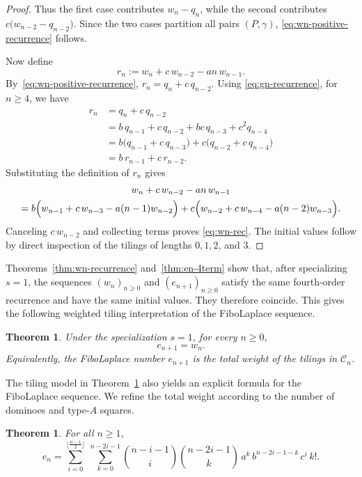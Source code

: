 \documentclass[11pt]{amsart}
\theoremstyle{plain}
\numberwithin{equation}{section}
\newtheorem{theorem}[thm]{Theorem}
\begin{document}
\begin{proof}
Thus the first case contributes $w_n-q_n$, while the second contributes
$c\bigl(w_{n-2}-q_{n-2}\bigr)$. Since the two cases partition all
pairs $(P,\gamma)$, \eqref{eq:wn-positive-recurrence} follows.

Now define
\[
r_n:=w_n+c\,w_{n-2}-an\,w_{n-1}.
\]
By~\eqref{eq:wn-positive-recurrence}, $r_n=q_n+c\,q_{n-2}$. Using \eqref{eq:gn-recurrence}, for $n\geq 4$, we have
\begin{align*}
r_n
&=q_n+c\,q_{n-2}\\
&=b\,q_{n-1}+c\,q_{n-2}
  +bc\,q_{n-3}+c^2q_{n-4}\\
&=b\bigl(q_{n-1}+c\,q_{n-3}\bigr)
  +c\bigl(q_{n-2}+c\,q_{n-4}\bigr)\\
&=b\,r_{n-1}+c\,r_{n-2}.
\end{align*}
Substituting the definition of $r_n$ gives
\begin{multline*}
w_n+c\,w_{n-2}-an\,w_{n-1}
\\=
b\Bigl(
w_{n-1}+c\,w_{n-3}-a(n-1)w_{n-2}
\Bigr)+
c\Bigl(
w_{n-2}+c\,w_{n-4}-a(n-2)w_{n-3}
\Bigr).
\end{multline*}
Canceling $c\,w_{n-2}$ and collecting terms proves \eqref{eq:wn-rec}. The initial values follow by direct inspection of the tilings of lengths $0,1,2$, and $3$.
\end{proof}
\par\medskip

Theorems~\ref{thm:wn-recurrence} and~\ref{thm:en-4term} show that,
after specializing $s=1$, the sequences $(w_n)_{n\geq 0}$ and
$(e_{n+1})_{n\geq 0}$ satisfy the same fourth-order recurrence and
have the same initial values. They therefore coincide. This gives the
following weighted tiling interpretation of the FiboLaplace sequence.
\begin{theorem}\label{thm:en=wn}
Under the specialization $s=1$, for every $n\geq 0$,
\[
e_{n+1}=w_n.
\]
Equivalently, the FiboLaplace number $e_{n+1}$ is the total weight of
the tilings in $\mathcal{C}_n$.
\end{theorem}

The tiling model in Theorem~\ref{thm:en=wn} also yields an explicit
formula for the FiboLaplace sequence. We refine the total weight according to the number of dominoes and type-$A$ squares.

\begin{theorem}\label{en-cerrada1}
For all $n\geq 1$,
\[
e_n=\sum_{i=0}^{\lfloor\frac{n-1}{2}\rfloor}\ \sum_{k=0}^{n-2i-1}
\binom{n-i-1}{i}\binom{n-2i-1}{k}\,a^{k}\,b^{n-2i-1-k}\,c^{i}\,k!.
\]
\end{theorem}
\end{document}
